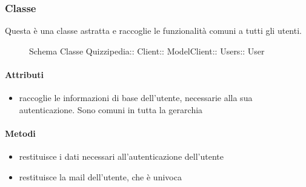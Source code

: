\subsubsection{Classe }
Questa è una classe astratta e raccoglie le funzionalità comuni a tutti gli utenti.
\begin{figure}[H]
\centering
\noindent{}
\caption[Schema Classe User]{Schema Classe Quizzipedia:: Client:: ModelClient:: Users:: User}
\end{figure}
\paragraph{Attributi}
\begin{itemize}
\item {}
\newline
raccoglie le informazioni di base dell'utente, necessarie alla sua autenticazione. Sono comuni in tutta la gerarchia
\end{itemize}
\paragraph{Metodi}
\begin{itemize}
\item {}
\newline
restituisce i dati necessari all'autenticazione dell'utente
\newline
\item {}
\newline
restituisce la mail dell'utente, che è univoca
\newline
\end{itemize}
